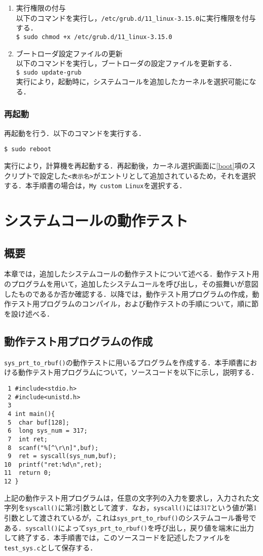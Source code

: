 \documentclass[12pt]{jsarticle}
\begin{document}
\begin{enumerate}
\item 実行権限の付与\\
以下のコマンドを実行し，\verb|/etc/grub.d/11_linux-3.15.0|に実行権限を付与する．\\
  \verb|$ sudo chmod +x /etc/grub.d/11_linux-3.15.0|\\
\item ブートローダ設定ファイルの更新\\
  以下のコマンドを実行し，ブートローダの設定ファイルを更新する．\\
  \verb|$ sudo update-grub|\\
  実行により，起動時に，システムコールを追加したカーネルを選択可能になる．
\end{enumerate}
\subsubsection{再起動}
再起動を行う．以下のコマンドを実行する．
\begin{verbatim}
$ sudo reboot
\end{verbatim}
  実行により，計算機を再起動する．再起動後，カーネル選択画面に\ref{boot}項のスクリプトで設定した\verb|<表示名>|がエントリとして追加されているため，それを選択する．本手順書の場合は，\verb|My custom Linux|を選択する．
\section{システムコールの動作テスト}
\subsection{概要}
本章では，追加したシステムコールの動作テストについて述べる．動作テスト用のプログラムを用いて，追加したシステムコールを呼び出し，その振舞いが意図したものであるか否か確認する．以降では，動作テスト用プログラムの作成，動作テスト用プログラムのコンパイル，および動作テストの手順について，順に節を設け述べる．
\subsection{動作テスト用プログラムの作成}
\verb|sys_prt_to_rbuf()|の動作テストに用いるプログラムを作成する．本手順書における動作テスト用プログラムについて，ソースコードを以下に示し，説明する．
\begin{verbatim}
 1 #include<stdio.h>
 2 #include<unistd.h>
 3
 4 int main(){
 5  char buf[128];
 6  long sys_num = 317;
 7  int ret;
 8  scanf("%[^\r\n]",buf);
 9  ret = syscall(sys_num,buf);
10  printf("ret:%d\n",ret);
11  return 0;
12 }
\end{verbatim}
上記の動作テスト用プログラムは，任意の文字列の入力を要求し，入力された文字列を\verb|syscall()|に第2引数として渡す．なお，\verb|syscall()|には317という値が第1引数として渡されているが，これは\verb|sys_prt_to_rbuf()|のシステムコール番号である．\verb|syscall()|によって\verb|sys_prt_to_rbuf()|を呼び出し，戻り値を端末に出力して終了する．本手順書では，このソースコードを記述したファイルを\verb|test_sys.c|として保存する．
\end{document}
